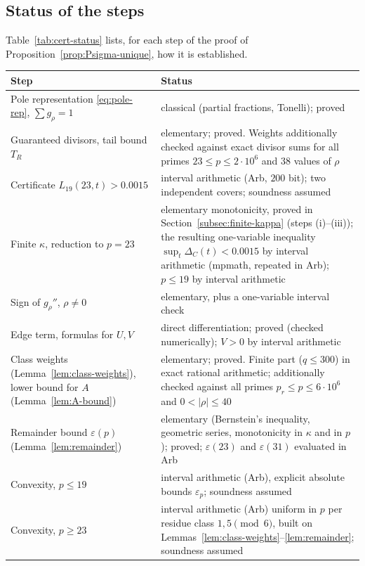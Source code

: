 \subsection{Status of the steps}
Table~\ref{tab:cert-status} lists, for each step of the proof of Proposition~\ref{prop:Psigma-unique}, how it is established.
\begin{table}[!h]
\centering
\small
\begin{tabular}{p{}p{}}
\hline
Step & Status\\
\hline
Pole representation \eqref{eq:pole-rep}, $\sum g_\rho=1$ & classical (partial fractions, Tonelli); proved\\
Guaranteed divisors, tail bound $T_R$ & elementary; proved. Weights additionally checked against exact divisor sums for all primes $23\le p\le2\cdot10^6$ and $38$ values of $\rho$\\
Certificate $L_{19}(23,t)>0.0015$ & interval arithmetic (Arb, $200$ bit); two independent covers; soundness assumed\\
Finite $\kappa$, reduction to $p=23$ & elementary monotonicity, proved in Section~\ref{subsec:finite-kappa} (steps (i)--(iii)); the resulting one-variable inequality $\sup_t\Delta_C(t)<0.0015$ by interval arithmetic (mpmath, repeated in Arb); $p\le19$ by interval arithmetic\\
Sign of $g_\rho''$, $\rho\ne0$ & elementary, plus a one-variable interval check\\
Edge term, formulas for $U,V$ & direct differentiation; proved (checked numerically); $V>0$ by interval arithmetic\\
Class weights (Lemma~\ref{lem:class-weights}), lower bound for $A$ (Lemma~\ref{lem:A-bound}) & elementary; proved. Finite part ($q\le300$) in exact rational arithmetic; additionally checked against all primes $p_r\le p\le6\cdot10^6$ and $0<|\rho|\le40$\\
Remainder bound $\varepsilon(p)$ (Lemma~\ref{lem:remainder}) & elementary (Bernstein's inequality, geometric series, monotonicity in $\kappa$ and in $p$); proved; $\varepsilon(23)$ and $\varepsilon(31)$ evaluated in Arb\\
Convexity, $p\le19$ & interval arithmetic (Arb), explicit absolute bounds $\varepsilon_p$; soundness assumed\\
Convexity, $p\ge23$ & interval arithmetic (Arb) uniform in $p$ per residue class $1,5\pmod6$, built on Lemmas~\ref{lem:class-weights}--\ref{lem:remainder}; soundness assumed\\

\end{tabular}
\end{table}
